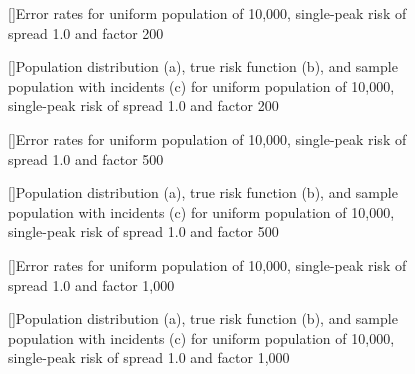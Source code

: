 {%

\begin{figure}[!htb]
    
    []{Error rates for uniform population of 10,000, single-peak risk of \gls{spread} 1.0 and \gls{factor} 200}
    \label{tab:mean_error_rates:unif_200_1.0_1h}
    
    []{Population distribution (a), true risk function (b), and sample population with incidents (c) for uniform population of 10,000, single-peak risk of \gls{spread} 1.0 and \gls{factor} 200}
    \label{fig:distributions:unif_200_1.0_1h}    
\end{figure}



\begin{figure}[!htb]
    
    []{Error rates for uniform population of 10,000, single-peak risk of \gls{spread} 1.0 and \gls{factor} 500}
    \label{tab:mean_error_rates:unif_500_1.0_1h}
    
    []{Population distribution (a), true risk function (b), and sample population with incidents (c) for uniform population of 10,000, single-peak risk of \gls{spread} 1.0 and \gls{factor} 500}
    \label{fig:distributions:unif_500_1.0_1h}    
\end{figure}



\begin{figure}[!htb]
    
    []{Error rates for uniform population of 10,000, single-peak risk of \gls{spread} 1.0 and \gls{factor} 1,000}
    \label{tab:mean_error_rates:unif_1000_1.0_1h}
    
    []{Population distribution (a), true risk function (b), and sample population with incidents (c) for uniform population of 10,000, single-peak risk of \gls{spread} 1.0 and \gls{factor} 1,000}
    \label{fig:distributions:unif_1000_1.0_1h}    
\end{figure}

 
}
